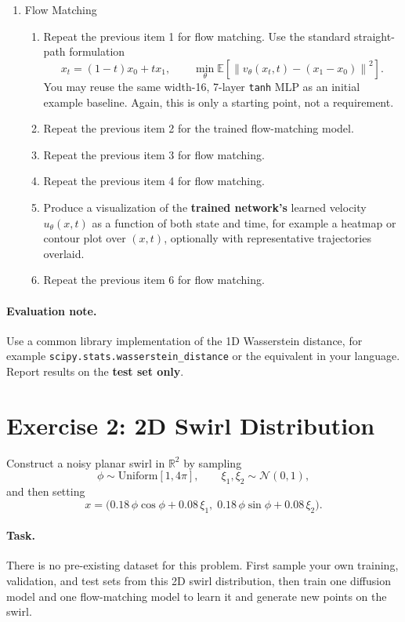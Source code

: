 \documentclass[11pt]{article}
\begin{document}
\begin{enumerate}
  \item Flow Matching
  \begin{enumerate}
    \item Repeat the previous item 1 for flow matching. Use the standard straight-path formulation
    \[
      x_t = (1-t)x_0 + t x_1,
      \qquad
      \min_\theta \mathbb{E}\left[\left\lVert v_\theta(x_t,t) - (x_1-x_0) \right\rVert^2\right].
    \]
    You may reuse the same width-16, 7-layer \texttt{tanh} MLP as an initial example baseline. Again, this is only a starting point, not a requirement.
    \item Repeat the previous item 2 for the trained flow-matching model.
    \item Repeat the previous item 3 for flow matching.
    \item Repeat the previous item 4 for flow matching.
    \item Produce a visualization of the \textbf{trained network's} learned velocity $u_\theta(x,t)$ as a function of both state and time, for example a heatmap or contour plot over $(x,t)$, optionally with representative trajectories overlaid.
    \item Repeat the previous item 6 for flow matching.
  \end{enumerate}
\end{enumerate}

\paragraph{Evaluation note.}
Use a common library implementation of the 1D Wasserstein distance, for example \texttt{scipy.stats.wasserstein\_distance} or the equivalent in your language. Report results on the \textbf{test set only}.

\section*{Exercise 2: 2D Swirl Distribution}
\aitrap Construct a noisy planar swirl in $\mathbb{R}^2$ by sampling
\[
  \phi \sim \mathrm{Uniform}[1,4\pi],
  \qquad
  \xi_1,\xi_2 \sim \mathcal{N}(0,1),
\]
and then setting
\[
  x =
  \bigl(
    0.18\,\phi\cos\phi + 0.08\,\xi_1,\;
    0.18\,\phi\sin\phi + 0.08\,\xi_2
  \bigr).
\]

\paragraph{Task.}
There is no pre-existing dataset for this problem. First sample your own training, validation, and test sets from this 2D swirl distribution, then train one diffusion model and one flow-matching model to learn it and generate new points on the swirl.
\end{document}
